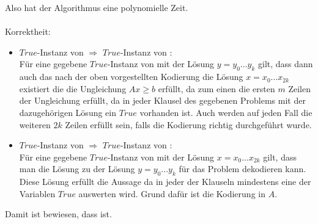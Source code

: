 \documentclass[a4paper,11pt]{scrartcl}
\begin{document}
\begin{enumerate}[label=(\alph*)]
		Also hat der Algorithmus eine polynomielle Zeit.\\
		\\
		Korrektheit:\\
		\begin{itemize}
		\item
			$True$-Instanz von  $\Rightarrow$ $True$-Instanz von :\\
			Für eine gegebene $True$-Instanz von  mit der Lösung $y = y_0 ... y_k$ gilt, dass dann auch das nach der oben vorgestellten Kodierung die Lösung $x = x_0 ... x_{2k}$ existiert die die Ungleichung $Ax \geq b$ erfüllt, da zum einen die ersten $m$ Zeilen der Ungleichung erfüllt, da in jeder Klausel des gegebenen Problems mit der dazugehörigen Lösung ein $True$ vorhanden ist. Auch werden auf jeden Fall die weiteren $2k$ Zeilen erfüllt sein, falls die Kodierung richtig durchgeführt wurde.
			
		\item
			$True$-Instanz von  $\Rightarrow$ $True$-Instanz von :\\
			Für eine gegebene $True$-Instanz von  mit der Lösung $x = x_0 ... x_{2k}$ gilt, dass man die Lösung zu der Lösung $y = y_0 ... y_k$ für das  Problem dekodieren kann. Diese Lösung erfüllt die  Aussage da in jeder der Klauseln mindestens eine der Variablen $True$ auswerten wird. Grund dafür ist die Kodierung in $A$.
		\end{itemize}
		Damit ist bewiesen, dass   ist.
	\end{enumerate}
	
\end{document}
